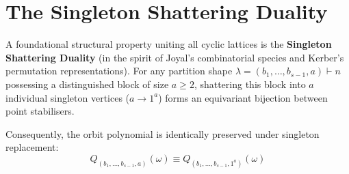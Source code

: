 \section{The Singleton Shattering Duality}

A foundational structural property uniting all cyclic lattices is the \textbf{Singleton Shattering Duality} (in the spirit of Joyal's combinatorial species and Kerber's permutation representations). For any partition shape $\lambda = (b_1, \dots, b_{s-1}, a) \vdash n$ possessing a distinguished block of size $a \ge 2$, shattering this block into $a$ individual singleton vertices ($a \to 1^a$) forms an equivariant bijection between point stabilisers.

Consequently, the orbit polynomial is identically preserved under singleton replacement:
\begin{equation}
Q_{(b_1, \dots, b_{s-1}, a)}(\omega) \equiv Q_{(b_1, \dots, b_{s-1}, 1^a)}(\omega)
\end{equation}

